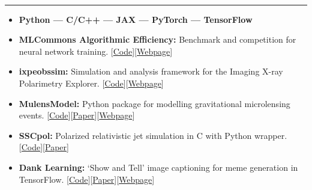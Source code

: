 \documentclass[11pt, oneside]{article}
\newenvironment{ressection}[1]{
	\vspace{4pt}
	{\selectfont\Large\color{Mycolor2}{\textbf{#1}}}
	\vspace{-6.5pt} \\
	\textcolor{Mycolor2}{\rule{\textwidth}{0.7pt}}
	\begin{itemize}
	\vspace{3pt}
}{
	\end{itemize}
}
\newcommand{\resitem}[1]{
	\vspace{-4pt}
	\item[] \begin{flushleft} #1 \end{flushleft}
}
\begin{document}
\begin{ressection}{\textbf{Open Source} ($\bigstar$1000+)}

	\resitem{\textbf{\textcolor{Mycolor2}{Python --- C/C++ --- JAX --- PyTorch --- TensorFlow}}}

	\vspace{4pt}
	\resitem{\textbf{MLCommons Algorithmic Efficiency:} Benchmark and competition for neural network training. [\href{https://github.com/mlcommons/algorithmic-efficiency}{Code}][\href{https://mlcommons.org/en/groups/research-algorithms/}{Webpage}]}

    \vspace{2pt}
	\resitem{\textbf{ixpeobssim:} Simulation and analysis framework for the Imaging X-ray Polarimetry Explorer. [\href{https://github.com/lucabaldini/ixpeobssim}{Code}][\href{https://ixpeobssim.readthedocs.io/en/latest/index.html}{Webpage}]}

    \vspace{2pt}
	\resitem{\textbf{MulensModel:}  Python package for modelling gravitational microlensing events. [\href{https://github.com/rpoleski/MulensModel}{Code}][\href{https://arxiv.org/abs/2201.01110}{Paper}][\href{https://rpoleski.github.io/MulensModel/}{Webpage}]}

	\vspace{2pt}
	\resitem{\textbf{SSCpol:}  Polarized relativistic jet simulation in C with Python wrapper. [\href{https://github.com/alpv95/SSCpol}{Code}][\href{https://ui.adsabs.harvard.edu/abs/2019ApJ...885...76P/abstract}{Paper}]}

	\vspace{2pt}
	\resitem{\textbf{Dank Learning:} `Show and Tell' image captioning for meme generation in TensorFlow. [\href{https://github.com/alpv95/Dank-Learning}{Code}][\href{https://arxiv.org/abs/1806.04510}{Paper}][\href{https://danklearning.com/}{Webpage}]}

\end{ressection}

\newpage
\end{document}
